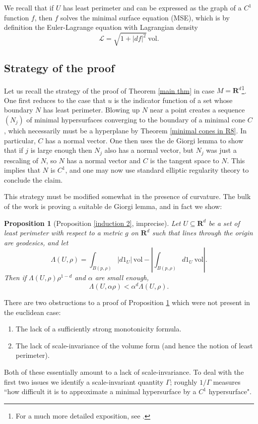 \documentclass[reqno,12pt,letterpaper]{amsart}
\newcommand{\RR}{\mathbf{R}}
\newcommand{\vol}{\mathrm{vol}}
\newtheorem{proposition}[theorem]{Proposition}
\theoremstyle{definition}
\numberwithin{equation}{section}
\begin{document}
We recall that if $U$ has least perimeter and can be expressed as the graph of a $C^1$ function $f$, then $f$ solves the minimal surface equation (MSE), which is by definition the Euler-Lagrange equation with Lagrangian density
\begin{equation}\label{Lagrangian density}
\mathscr L = \sqrt{1 + |df|^2} ~\vol.
\end{equation}


\subsection{Strategy of the proof}

Let us recall the strategy of the proof of Theorem \ref{main thm} in case $M = \RR^d$\footnote{For a much more detailed exposition, see \cite{Giusti77}.}.
One first reduces to the case that $u$ is the indicator function of a set whose boundary $N$ has least perimeter.
Blowing up $N$ near a point creates a sequence $(N_j)$ of minimal hypersurfaces converging to the boundary of a minimal cone $C$, which necessarily must be a hyperplane by Theorem \ref{minimal cones in R8}.
In particular, $C$ has a normal vector.
One then uses the de Giorgi lemma \cite{deGiorgi61} to show that if $j$ is large enough then $N_j$ also has a normal vector, but $N_j$ was just a rescaling of $N$, so $N$ has a normal vector and $C$ is the tangent space to $N$.
This implies that $N$ is $C^1$, and one may now use standard elliptic regularity theory to conclude the claim.

This strategy must be modified somewhat in the presence of curvature.
The bulk of the work is proving a suitable de Giorgi lemma, and in fact we show:

\begin{proposition}[Proposition \ref{induction 2}, imprecise]\label{imprecise induction 2}
Let $U \subseteq \RR^d$ be a set of least perimeter with respect to a metric $g$ on $\RR^d$ such that lines through the origin are geodesics, and let
$$\Lambda(U, \rho) = \int_{B(p, \rho)} |d1_U| ~\vol - \left|\int_{B(p, \rho)} d1_U ~\vol\right|.$$
Then if $\Lambda(U, \rho)\rho^{1 - d}$ and $\alpha$ are small enough,
$$\Lambda(U, \alpha \rho) < \alpha^d \Lambda(U, \rho).$$
\end{proposition}

There are two obstructions to a proof of Proposition \ref{imprecise induction 2} which were not present in the euclidean case:
\begin{enumerate}
\item The lack of a sufficiently strong monotonicity formula.
\item The lack of scale-invariance of the volume form (and hence the notion of least perimeter).
\end{enumerate}
Both of these essentially amount to a lack of scale-invariance.
To deal with the first two issues we identify a scale-invariant quantity $\Gamma$; roughly $1/\Gamma$ measures ``how difficult it is to approximate a minimal hypersurface by a $C^1$ hypersurface".
\end{document}
